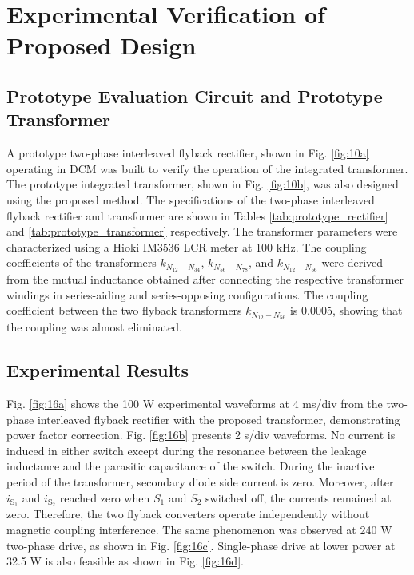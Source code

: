 \documentclass[lettersize,journal]{IEEEtran}
\begin{document}
\section{Experimental Verification of Proposed Design}

\subsection{Prototype Evaluation Circuit and Prototype Transformer}
A prototype two-phase interleaved flyback rectifier, shown in Fig. \ref{fig:10a} operating in DCM was built to verify the operation of the integrated transformer. The prototype integrated transformer, shown in Fig. \ref{fig:10b}, was also designed using the proposed method. The specifications of the two-phase interleaved flyback rectifier and transformer are shown in Tables \ref{tab:prototype_rectifier} and \ref{tab:prototype_transformer} respectively. The transformer parameters were characterized using a Hioki IM3536 LCR meter at 100 kHz. The coupling coefficients of the transformers $k_{N_{12}-N_{34}}$, $k_{N_{56}-N_{78}}$, and $k_{N_{12}-N_{56}}$ were derived from the mutual inductance obtained after connecting the respective transformer windings in series-aiding and series-opposing configurations. The coupling coefficient between the two flyback transformers $k_{N_{12}-N_{56}}$ is 0.0005, showing that the coupling was almost eliminated.



\subsection{Experimental Results}
Fig. \ref{fig:16a} shows the 100 W experimental waveforms at 4 ms/div from the two-phase interleaved flyback rectifier with the proposed transformer, demonstrating power factor correction. Fig. \ref{fig:16b} presents 2 \textmu s/div waveforms. No current is induced in either switch except during the resonance between the leakage inductance and the parasitic capacitance of the switch. During the inactive period of the transformer, secondary diode side current is zero. Moreover, after $i_{\mathrm{S}_1}$ and $i_{\mathrm{S}_2}$ reached zero when $S_1$ and $S_2$ switched off, the currents remained at zero. Therefore, the two flyback converters operate independently without magnetic coupling interference. The same phenomenon was observed at 240 W two-phase drive, as shown in Fig. \ref{fig:16c}. Single-phase drive at lower power at 32.5 W is also feasible as shown in Fig. \ref{fig:16d}.
\end{document}
